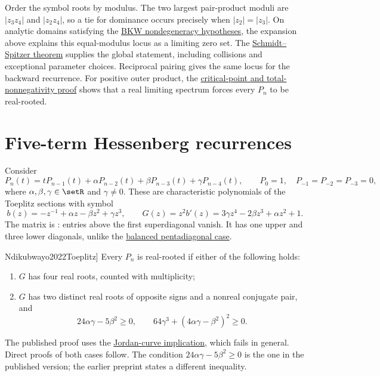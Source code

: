 Order the symbol roots by modulus. The two largest pair-product moduli
are $|z_3z_4|$ and $|z_2z_4|$, so a tie for dominance occurs precisely
when $|z_2|=|z_3|$. On analytic domains satisfying the
\hyperref[toeplitzBkwTheorem]{BKW nondegeneracy hypotheses}, the expansion
above explains this equal-modulus locus as a limiting zero set.
The \hyperref[toeplitzSpectra]{Schmidt--Spitzer theorem} supplies the
global statement, including collisions and exceptional parameter choices.
Reciprocal pairing gives the same locus for the backward recurrence.
For positive outer product, the
\hyperref[toeplitzPentadiagonal]{critical-point and total-nonnegativity proof}
shows that a real limiting spectrum forces every $P_n$ to be real-rooted.

\section[toeplitzHessenberg]{Five-term Hessenberg recurrences}

Consider
\[
 P_n(t)=tP_{n-1}(t)+\alpha P_{n-2}(t)+\beta P_{n-3}(t)+\gamma P_{n-4}(t),
 \qquad P_0=1,\quad P_{-1}=P_{-2}=P_{-3}=0,
\]
where $\alpha,\beta,\gamma\in\setR$ and $\gamma\ne0$.
These are characteristic polynomials of the Toeplitz sections with symbol
\[
 b(z)=-z^{-1}+\alpha z-\beta z^2+\gamma z^3,\qquad
 G(z)=z^2b'(z)=3\gamma z^4-2\beta z^3+\alpha z^2+1.
\]
The matrix is : entries above the first
superdiagonal vanish. It has one upper and three lower diagonals, unlike the
\hyperref[toeplitzPentadiagonal]{balanced pentadiagonal case}.

\begin{theorem}[Sufficiency in \cite[Thm.~5]{Ndikubwayo2022Toeplitz}]
Every $P_n$ is real-rooted if either of the following holds:
\begin{enumerate}
\item[(a)] $G$ has four real roots, counted with multiplicity;
\item[(b)] $G$ has two distinct real roots of opposite signs and a nonreal
conjugate pair, and
\[
 24\alpha\gamma-5\beta^2\geq0,\qquad
 64\gamma^3+(4\alpha\gamma-\beta^2)^2\geq0.
\]
\end{enumerate}
\end{theorem}

The published proof uses the
\hyperref[toeplitzSpectra]{Jordan-curve implication}, which fails in general.
Direct proofs of both cases follow. The condition
$24\alpha\gamma-5\beta^2\geq0$ is the one in the published version; the
earlier preprint states a different inequality.

